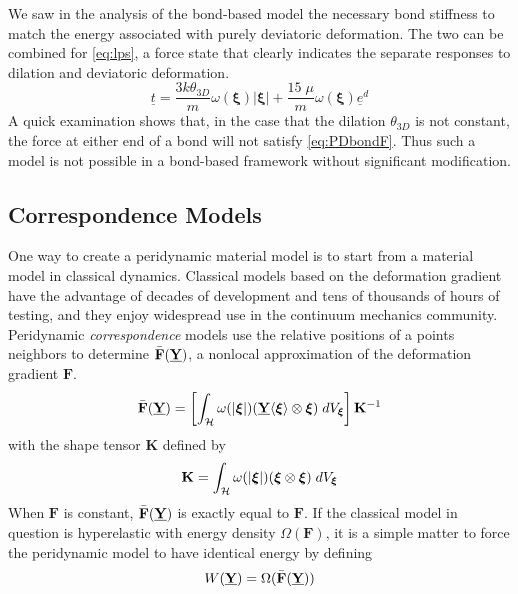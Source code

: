 %
We saw in the analysis of the bond-based model the necessary bond stiffness to match the energy associated with purely deviatoric deformation.
The two can be combined for \cref{eq:lps}, a force state that clearly indicates the separate responses to dilation and deviatoric deformation.
%
\begin{equation}
\label{eq:lps}
\underline{t} = \frac{3k\theta_{3D}}{m}\omega(\boldsymbol{\xi})|\boldsymbol{\xi}| + \frac{15\;\mu}{m}\omega(\boldsymbol{\xi})\underline{e}^d
\end{equation}
%
A quick examination shows that, in the case that the dilation $\theta_{3D}$ is not constant, the force at either end of a bond will not satisfy \cref{eq:PDbondF}.
Thus such a model is not possible in a bond-based framework without significant modification.

\subsection{Correspondence Models}
One way to create a peridynamic material model is to start from a material model in classical dynamics.
Classical models based on the deformation gradient have the advantage of decades of development and tens of thousands of hours of testing, and they enjoy widespread use in the continuum mechanics community.
Peridynamic \textit{correspondence} models use the relative positions of a points neighbors to determine $\bar{\mathbf{F}}(\vstate{Y}{}{})$, a nonlocal approximation of the deformation gradient $\mathbf{F}$.
%
\begin{equation}
\label{eq:PDapproxGradient}
\bar{\mathbf{F}}(\vstate{Y}{}{}) = \left[\int_\mathcal{H} \omega(|\boldsymbol{\xi}|)(\vstate{Y}{}{\boldsymbol{\xi}}\otimes \boldsymbol{\xi})\;dV_{\boldsymbol{\xi}} \right]\mathbf{K}^{-1}
\end{equation}
with the shape tensor $\mathbf{K}$ defined by
\begin{equation}
\mathbf{K} = \int_\mathcal{H}\omega(|\boldsymbol{\xi}|)(\boldsymbol{\xi} \otimes \boldsymbol{\xi})\;dV_{\boldsymbol{\xi}} \notag
\end{equation}
%
When $\mathbf{F}$ is constant, $\bar{\mathbf{F}}(\vstate{Y}{}{})$ is exactly equal to $\mathbf{F}$.
If the classical model in question is hyperelastic with energy density $\Omega(\mathbf{F})$, it is a simple matter to force the peridynamic model to have identical energy by defining
\begin{equation}
W(\vstate{Y}{}{}) = \Omega(\bar{\mathbf{F}}(\vstate{Y}{}{}))
\end{equation}
